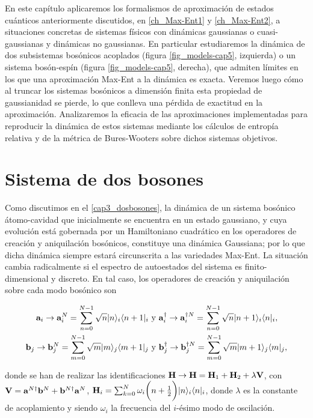 \documentclass{report} %
\numberwithin{equation}{section}
\begin{document}
En este capítulo aplicaremos los formalismos de aproximación de estados cuánticos anteriormente discutidos, en \autoref{ch_Max-Ent1} y \autoref{ch_Max-Ent2}, a situaciones concretas de sistemas físicos con dinámicas gaussianas o cuasi-gaussianas y dinámicas no gaussianas. En particular estudiaremos la dinámica de dos subsistemas bosónicos acoplados (figura \ref{fig_models-cap5}, izquierda) o un sistema bosón-espín (figura \ref{fig_models-cap5}, derecha), que admiten límites en los que una aproximación Max-Ent a la dinámica es exacta. Veremos luego cómo al truncar los sistemas bosónicos a dimensión finita esta propiedad de gaussianidad se pierde, lo que conlleva una pérdida de exactitud en la aproximación.
Analizaremos la eficacia de las aproximaciones implementadas para reproducir la dinámica de estos sistemas mediante los cálculos de entropía relativa y de la métrica de Bures-Wooters sobre dichos sistemas objetivos.

\section{Sistema de dos bosones}
\label{two_boson_system}

Como discutimos en el  \autoref{cap3_dosbosones}, la dinámica de un sistema bosónico átomo-cavidad que inicialmente se encuentra en un estado gaussiano, y cuya evolución está gobernada por un Hamiltoniano cuadrático en los operadores de creación y aniquilación bosónicos, constituye una dinámica Gaussiana; por lo que dicha dinámica siempre estará circunscrita a las variedades Max-Ent. La situación cambia radicalmente si el espectro de autoestados del sistema es finito-dimensional y discreto. En tal caso, los operadores de creación y aniquilación sobre cada modo bosónico son

\begin{subequations}
\begin{align}
{\bf a}_{i}\rightarrow {\bf a}^{N}_{i}=\sum_{n=0}^{N-1}\sqrt{n}|n\rangle_i \langle n+1|_i & \textnormal{ y }{\bf a}^{\dagger}_{i}\rightarrow {\bf a}^{\dagger N}_{i}=\sum_{n=0}^{N-1}\sqrt{n}|n+1\rangle_i \langle n|_i, \\
{\bf b}_{j}\rightarrow {\bf b}^{N}_{j}=\sum_{m=0}^{N-1}\sqrt{m}|m\rangle_j \langle m+1|_j & \textnormal{ y }{\bf b}^{\dagger}_{j}\rightarrow {\bf b}^{\dagger N}_{j}=\sum_{m=0}^{N-1}\sqrt{m}|m+1\rangle_j \langle m|_j,
\end{align}
\end{subequations}

donde se han de realizar las identificaciones ${\bf H}\rightarrow  {\bf H}={ \bf H}_1 + { \bf H}_2 + \lambda {\bf V}$, 
con ${\bf V}={\bf a}^{N\dagger}{\bf b}^{N}+{\bf b}^{N\dagger}{\bf a}^{N}$, 
${\bf H}_i=\sum_{k=0}^{N}\omega_i \bigg(n+\frac{1}{2}\bigg)|n \rangle_i\langle n|_i$, donde $\lambda$ es la constante de acoplamiento y siendo $\omega_i$ la frecuencia del $i$-ésimo modo de oscilación.
\end{document}
